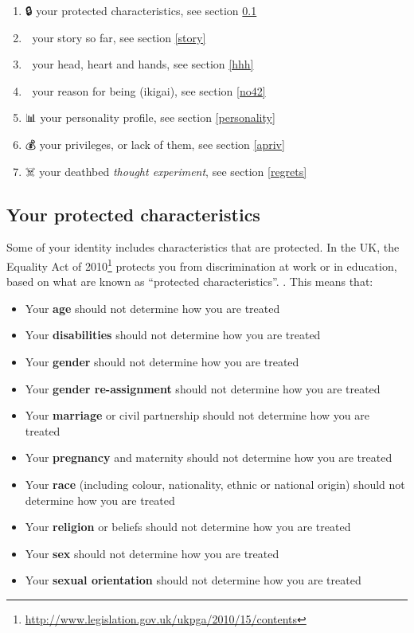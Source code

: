\documentclass[
]{book}
\providecommand{\tightlist}{%
  \setlength{\itemsep}{0pt}\setlength{\parskip}{0pt}}
\begin{document}
\begin{enumerate}
\def\labelenumi{\arabic{enumi}.}
\tightlist
\item
  🔒 your protected characteristics, see section \ref{protected}
\item
  📕 your story so far, see section \ref{story}
\item
  🙂 your head, heart and hands, see section \ref{hhh}
\item
  🤔 your reason for being (ikigai), see section \ref{no42}
\item
  📊 your personality profile, see section \ref{personality}
\item
  💰 your privileges, or lack of them, see section \ref{apriv}
\item
  ☠️ your deathbed \emph{thought experiment}, see section \ref{regrets}
\end{enumerate}

\hypertarget{protected}{%
\subsection{Your protected characteristics}\label{protected}}

Some of your identity includes characteristics that are protected. In the UK, the Equality Act of 2010\footnote{\url{http://www.legislation.gov.uk/ukpga/2010/15/contents}} protects you from discrimination at work or in education, based on what are known as ``protected characteristics''. \citep{equality}. This means that:

\begin{itemize}
\tightlist
\item
  Your \textbf{age} should not determine how you are treated
\item
  Your \textbf{disabilities} should not determine how you are treated
\item
  Your \textbf{gender} should not determine how you are treated \citep{inferior, damore, damoreguardian, everydaysexism}
\item
  Your \textbf{gender re-assignment} should not determine how you are treated
\item
  Your \textbf{marriage} or civil partnership should not determine how you are treated
\item
  Your \textbf{pregnancy} and maternity should not determine how you are treated
\item
  Your \textbf{race} (including colour, nationality, ethnic or national origin) should not determine how you are treated \citep{nottalking, superior}
\item
  Your \textbf{religion} or beliefs should not determine how you are treated
\item
  Your \textbf{sex} should not determine how you are treated \citep{harassment}
\item
  Your \textbf{sexual orientation} should not determine how you are treated \citep{nosex}
\end{itemize}
\end{document}
